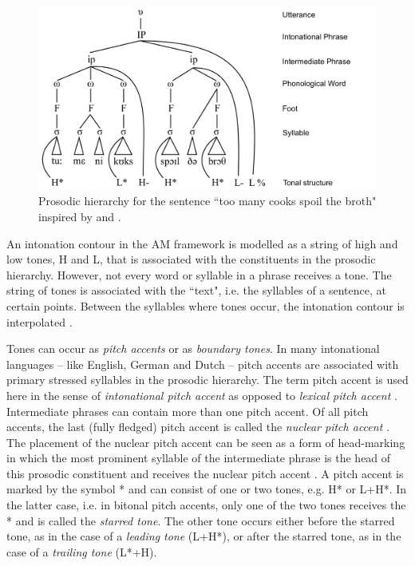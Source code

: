 \begin{figure}
\includegraphics[width=\textwidth]{figures/ch4/prosodic_hierarchy.pdf}
\caption{Prosodic hierarchy for the sentence ``too many cooks spoil the broth" inspired by \citet{Grice2006} and \citet{Gussenhoven2004}.}
\label{fig:prosodic_hierarchy}
\end{figure}

An intonation contour in the AM framework is modelled as a string of high and low tones, H and L, that is associated with the constituents in the prosodic hierarchy. However, not every word or syllable in a phrase receives a tone. The string of tones is associated with the ``text", i.e. the syllables of a sentence, at certain points. Between the syllables where tones occur, the intonation contour is interpolated \citep{Ladd2008}. 

Tones can occur as \emph{pitch accents} or as \emph{boundary tones}. In many intonational languages -- like English, German and Dutch -- pitch accents are associated with primary stressed syllables in the prosodic hierarchy. The term pitch accent is used here in the sense of \emph{intonational pitch accent} as opposed to \emph{lexical pitch accent} \citep{Ladd2008}. Intermediate phrases can contain more than one pitch accent. Of all pitch accents, the last (fully fledged) pitch accent is called the \emph{nuclear pitch accent} \citep{Gussenhoven2004}. The placement of the nuclear pitch accent can be seen as a form of head-marking \citep{BeckmanEdwards1994, ShattuckHufnagelTurk1996} in which the most prominent syllable of the intermediate phrase is the head of this prosodic constituent and receives the nuclear pitch accent \citep{Grice2006}. A pitch accent is marked by the symbol * and can consist of one or two tones, e.g. H* or L+H*. In the latter case, i.e. in bitonal pitch accents, only one of the two tones receives the * and is called the \emph{starred tone}. The other tone occurs either before the starred tone, as in the case of a \emph{leading tone} (L+H*), or after the starred tone, as in the case of a \emph{trailing tone} (L*+H). 

